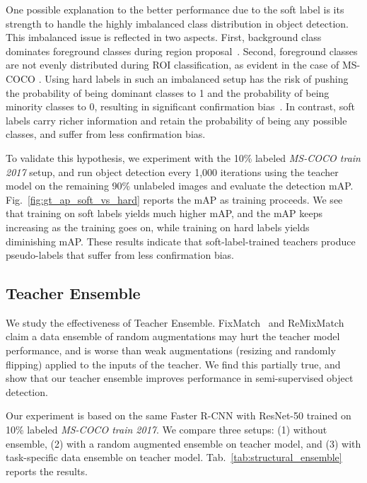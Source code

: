 \documentclass[final]{cvpr}
\begin{document}
One possible explanation to the better performance due to the soft label is its strength to handle the highly imbalanced class distribution in object detection. 
This imbalanced issue is reflected in two aspects. 
First, background class dominates foreground classes during region proposal~\cite{ren2015faster}. 
Second, foreground classes are not evenly distributed during ROI classification, as evident in the case of MS-COCO \cite{lin2014microsoft}. 
Using hard labels in such an imbalanced setup has the risk of pushing the probability of being dominant classes to 1 and the probability of being minority classes to 0, resulting in significant confirmation bias~\cite{confirmation_bias}. In contrast, soft labels carry richer information and retain the probability of being any possible classes, and suffer from less confirmation bias.

To validate this hypothesis, we experiment with the 10\% labeled \textit{MS-COCO train 2017} setup, and run object detection every 1,000 iterations using the teacher model on the remaining 90\% unlabeled images and evaluate the detection mAP. Fig.~\ref{fig:gt_ap_soft_vs_hard} reports the mAP as training proceeds. We see that training on soft labels yields much higher mAP, and the mAP keeps increasing as the training goes on, while training on hard labels yields diminishing mAP. These results indicate that soft-label-trained teachers produce pseudo-labels that suffer from less confirmation bias. 

\subsection{Teacher Ensemble}
\label{sec:exp:structual_ensemble}

We study the effectiveness of Teacher Ensemble. 
FixMatch~\cite{sohn2020fixmatch} and ReMixMatch~\cite{berthelot2019remixmatch} claim a data ensemble of random augmentations may hurt the teacher model performance, and is worse than weak augmentations (resizing and randomly flipping) applied to the inputs of the teacher.
We find this partially true, and show that our teacher ensemble improves performance in semi-supervised object detection.

Our experiment is based on the same Faster R-CNN with ResNet-50 trained on 10\% labeled \textit{MS-COCO train 2017}. We compare three setups: (1) without ensemble, (2) with a random augmented ensemble on teacher model, and (3) with task-specific data ensemble on teacher model. Tab.~\ref{tab:structural_ensemble} reports the results.
\end{document}

